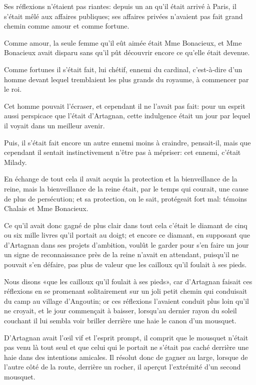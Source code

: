 Ses réflexions n'étaient pas riantes: depuis un an qu'il était arrivé à Paris, il s'était mêlé aux affaires publiques; ses affaires privées n'avaient pas fait grand chemin comme amour et comme fortune. 

Comme amour, la seule femme qu'il eût aimée était Mme Bonacieux, et Mme Bonacieux avait disparu sans qu'il pût découvrir encore ce qu'elle était devenue. 

Comme fortunes il s'était fait, lui chétif, ennemi du cardinal, c'est-à-dire d'un homme devant lequel tremblaient les plus grands du royaume, à commencer par le roi. 

Cet homme pouvait l'écraser, et cependant il ne l'avait pas fait: pour un esprit aussi perspicace que l'était d'Artagnan, cette indulgence était un jour par lequel il voyait dans un meilleur avenir. 

Puis, il s'était fait encore un autre ennemi moins à craindre, pensait-il, mais que cependant il sentait instinctivement n'être pas à mépriser: cet ennemi, c'était Milady. 

En échange de tout cela il avait acquis la protection et la bienveillance de la reine, mais la bienveillance de la reine était, par le temps qui courait, une cause de plus de persécution; et sa protection, on le sait, protégeait fort mal: témoins Chalais et Mme Bonacieux. 

Ce qu'il avait donc gagné de plus clair dans tout cela c'était le diamant de cinq ou six mille livres qu'il portait au doigt; et encore ce diamant, en supposant que d'Artagnan dans ses projets d'ambition, voulût le garder pour s'en faire un jour un signe de reconnaissance près de la reine n'avait en attendant, puisqu'il ne pouvait s'en défaire, pas plus de valeur que les cailloux qu'il foulait à ses pieds. 

Nous disons «que les cailloux qu'il foulait à ses pieds», car d'Artagnan faisait ces réflexions en se promenant solitairement sur un joli petit chemin qui conduisait du camp au village d'Angoutin; or ces réflexions l'avaient conduit plus loin qu'il ne croyait, et le jour commençait à baisser, lorsqu'au dernier rayon du soleil couchant il lui sembla voir briller derrière une haie le canon d'un mousquet. 

D'Artagnan avait l'œil vif et l'esprit prompt, il comprit que le mousquet n'était pas venu là tout seul et que celui qui le portait ne s'était pas caché derrière une haie dans des intentions amicales. Il résolut donc de gagner au large, lorsque de l'autre côté de la route, derrière un rocher, il aperçut l'extrémité d'un second mousquet. 

